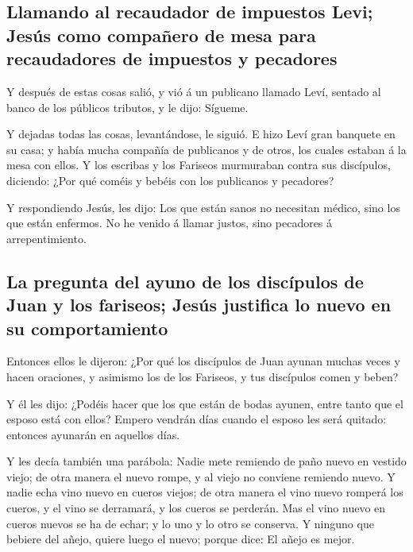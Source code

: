 \hypertarget{llamando-al-recaudador-de-impuestos-levi-jesuxfas-como-compauxf1ero-de-mesa-para-recaudadores-de-impuestos-y-pecadores}{%
\subsection{Llamando al recaudador de impuestos Levi; Jesús como
compañero de mesa para recaudadores de impuestos y
pecadores}\label{llamando-al-recaudador-de-impuestos-levi-jesuxfas-como-compauxf1ero-de-mesa-para-recaudadores-de-impuestos-y-pecadores}}

 Y después de estas cosas salió, y vió á un publicano
llamado Leví, sentado al banco de los públicos tributos, y le dijo:
Sígueme.

 Y dejadas todas las cosas, levantándose, le siguió.
 E hizo Leví gran banquete en su casa; y había mucha
compañía de publicanos y de otros, los cuales estaban á la mesa con
ellos.  Y los escribas y los Fariseos murmuraban contra
sus discípulos, diciendo: ¿Por qué coméis y bebéis con los publicanos y
pecadores?

 Y respondiendo Jesús, les dijo: Los que están sanos no
necesitan médico, sino los que están enfermos.  No he
venido á llamar justos, sino pecadores á arrepentimiento.

\hypertarget{la-pregunta-del-ayuno-de-los-discuxedpulos-de-juan-y-los-fariseos-jesuxfas-justifica-lo-nuevo-en-su-comportamiento}{%
\subsection{La pregunta del ayuno de los discípulos de Juan y los
fariseos; Jesús justifica lo nuevo en su
comportamiento}\label{la-pregunta-del-ayuno-de-los-discuxedpulos-de-juan-y-los-fariseos-jesuxfas-justifica-lo-nuevo-en-su-comportamiento}}

 Entonces ellos le dijeron: ¿Por qué los discípulos de
Juan ayunan muchas veces y hacen oraciones, y asimismo los de los
Fariseos, y tus discípulos comen y beben?

 Y él les dijo: ¿Podéis hacer que los que están de bodas
ayunen, entre tanto que el esposo está con ellos?  Empero
vendrán días cuando el esposo les será quitado: entonces ayunarán en
aquellos días.

 Y les decía también una parábola: Nadie mete remiendo de
paño nuevo en vestido viejo; de otra manera el nuevo rompe, y al viejo
no conviene remiendo nuevo.  Y nadie echa vino nuevo en
cueros viejos; de otra manera el vino nuevo romperá los cueros, y el
vino se derramará, y los cueros se perderán.  Mas el vino
nuevo en cueros nuevos se ha de echar; y lo uno y lo otro se conserva.
 Y ninguno que bebiere del añejo, quiere luego el nuevo;
porque dice: El añejo es mejor.

